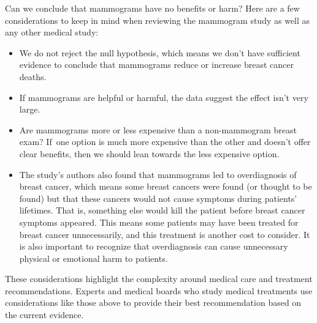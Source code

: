 Can we conclude that mammograms have no benefits or harm?
Here are a few considerations to keep in mind when reviewing
the mammogram study as well as any other medical study:
\begin{itemize}
\setlength{\itemsep}{0mm}
\item
    We do not reject the null hypothesis, which means
    we don't have sufficient evidence to conclude that
    mammograms reduce or increase breast cancer deaths.
\item
    If mammograms are helpful or harmful, the data
    suggest the effect isn't very large.
\item
    Are mammograms more or less expensive than
    a non-mammogram breast exam?
    If~one option is much more expensive than the
    other and doesn't offer clear benefits,
    then we should lean towards the less expensive
    option.
\item
    The study's authors also found that mammograms
    led to overdiagnosis of breast cancer,
    which means some breast cancers were found
    (or thought to be found) but that these cancers
    would not cause symptoms during patients' lifetimes.
    That is, something else would kill the patient
    before breast cancer symptoms appeared.
    This means some patients may have been treated
    for breast cancer unnecessarily, and this
    treatment is another cost to consider.
    It is also important to recognize that
    overdiagnosis can cause unnecessary physical
    or emotional harm to patients.
\end{itemize}
These considerations highlight the complexity around medical care and treatment recommendations. Experts and medical boards who study medical treatments use considerations like those above to provide their best recommendation based on the current evidence.


